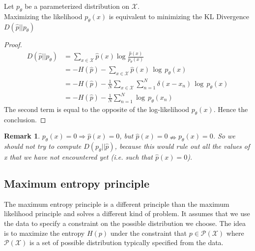 \documentclass[12pt]{report}
\newtheorem{remark}{Remark}[section]
\begin{document}
\begin{proposition}
Let $p_{\theta}$ be a parameterized distribution on $\mathcal{X}$.\\
Maximizing the likelihood $p_{\theta}(x)$ is equivalent to minimizing the KL Divergence $D(\hat{p} || p_{\theta})$
\end{proposition}



\begin{proof}
$$\begin{aligned} 
D(\hat{p} || p_{\theta}) &= \sum_{x\in\mathcal{X}} \hat{p}(x) \log  \frac{\hat{p}(x)}{p_{\theta}(x)}\\
&=  - H(\hat{p}) - \sum_{x \in \mathcal{X}} \hat{p}(x)\,\log \,p_{\theta}(x)\\
&=  -H(\hat{p}) - \frac{1}{N}\displaystyle\sum_{x \in \mathcal{X}} \displaystyle\sum_{n = 1}^{N} \delta(x-x_n)\,\log \,p_{\theta}(x)\\
&=  -H(\hat{p}) - \frac{1}{N} \sum_{n = 1}^{N} \log \,p_{\theta}(x_n)
\end{aligned} $$
The second term is equal to the opposite of the log-likelihood $p_{\theta}(x)$. Hence the conclusion.
\end{proof}

\begin{remark}
$p_\theta(x) = 0 \Rightarrow \hat{p}(x) = 0$, but $ \hat{p}(x) = 0 \nRightarrow p_\theta(x) = 0$. So we should not try to compute  $D(p_{\theta} || \hat{p})$, because this would rule out all the values of x that we have not encountered yet (i.e. such that $\hat{p}(x)=0$).
\end{remark}

\subsection{Maximum entropy principle}
The maximum entropy principle is a different principle than the maximum likelihood principle and solves a different kind of problem.
It assumes that we use the data to specify a constraint on the possible distribution we choose.
The idea is to maximize the entropy $H(p)$ under the constraint that $p\in \mathcal{P}(\mathcal{X})$ where $\mathcal{P}(\mathcal{X})$ is a set of possible distribution typically specified from the data.
\end{document}
